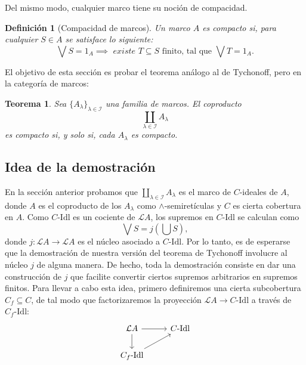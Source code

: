 \documentclass[12pt,letterpaper,titlepage]{article}
\newtheorem*{defn}{Definición}
\newtheorem{thm}{Teorema}
\theoremstyle{definition}
\newcommand\Sup{\bigvee}
\renewcommand\inf{\wedge}
\renewcommand\cal[1]{\mathcal{#1}}
\newcommand\scr[1]{\mathscr{#1}}
\newcommand\<{\langle}
\renewcommand\>{\rangle}
\newcommand\Idl{\text{-}\mathrm{Idl}}
\begin{document}
Del mismo modo, cualquier marco tiene su noción de compacidad.
\begin{defn}[Compacidad de marcos]
Un marco $A$ es compacto si, para cualquier $S\in A$
se satisface lo siguiente:
\[
    \Sup S= 1_A
    \implies
    \textit{ existe } T\subseteq S\text{ finito, tal que }
    \Sup T= 1_A
.\]
\end{defn}
El objetivo de esta sección es probar el teorema análogo
al de Tychonoff, pero en la categoría de marcos:
\begin{thm}
    Sea $\{A_\lambda\}_{\lambda\in\scr I}$ una familia de marcos.
    El coproducto
    \[
        \coprod_{\lambda\in\scr I}A_\lambda
    \]
    es compacto si, y solo si, cada $A_\lambda$ es compacto.
\end{thm}

\subsection{Idea de la demostración}

En la sección anterior probamos que
$\coprod_{\lambda\in\scr I}A_\lambda$
es el marco de $C$-ideales de $A$, donde $A$ es el coproducto
de los $A_\lambda$ como $\inf$-semiretículas y $C$ es cierta
cobertura en $A$.
Como $C\Idl$ es un cociente de $\cal LA$,
los supremos en $C\Idl$ se calculan como
\[
    \Sup S = j(\bigcup S)
,\]
donde $j:\cal LA\to\cal LA$ es el núcleo asociado a $C\Idl$.
Por lo tanto, es de esperarse que la demostración de
nuestra versión del teorema de Tychonoff involucre al núcleo
$j$ de alguna manera.
De hecho, toda la demostración consiste
en dar una construcción de $j$ que facilite convertir
ciertos supremos arbitrarios en supremos finitos.
Para llevar a cabo esta idea, primero definiremos una
cierta subcobertura $C_f\subseteq C$, de tal modo que
factorizaremos la proyección $\cal LA\to C\Idl$ a través de
$C_f\Idl$:
\[
    \begin{tikzcd}
        \cal LA \ar[d] \ar[r] & C\Idl \\
        C_f\Idl \ar[ur]
    \end{tikzcd}
\]
\end{document}
